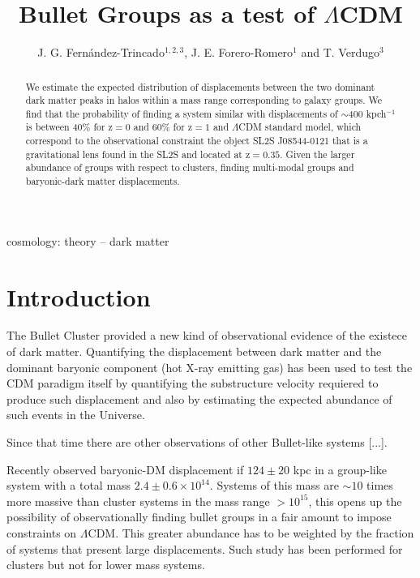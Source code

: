 \documentclass{emulateapj}
\newcommand{\hMsun}{{\ifmmode{h^{-1}{\rm {M_{\odot}}}}\else{$h^{-1}{\rm{M_{\odot}}}$}\fi}}
\newcommand{\Msun}{{\ifmmode{{\rm {M_{\odot}}}}\else{${\rm{M_{\odot}}}$}\fi}}
\begin{document}
 

\title{Bullet Groups as a test of $\Lambda$CDM}
\author{J. G. Fern\'andez-Trincado$^{1,2,3}$, J. E. Forero-Romero$^1$
  and T. Verdugo$^3$} 

\begin{abstract}
We estimate the expected distribution of displacements between the two
dominant dark matter peaks in halos within a mass range corresponding
to galaxy groups. We find that the probability of finding a system
similar with displacements of $\sim$400 kpch$^{-1}$ is between 40\%
for z$=0$ and 60\% for z$=1$ and $\Lambda$CDM standard model, which
correspond to the observational constraint the object SL2S J08544-0121
that is  a gravitational lens found in the SL2S and located at
z$=0.35$. Given the larger abundance of groups with respect to
clusters, finding multi-modal groups and baryonic-dark matter
displacements.  
\end{abstract}

\begin{keywords}
{cosmology: theory -- dark matter} 
\end{keywords}

\section{Introduction}


The Bullet Cluster provided a new kind of observational evidence of
the existece of dark matter. Quantifying the displacement between dark
matter and the dominant baryonic component (hot X-ray emitting gas)
has been used to test the CDM paradigm itself by quantifying the
substructure velocity requiered to produce such displacement and also
by estimating the expected abundance of such events in the Universe.

Since that time there are other observations of other Bullet-like
systems [...].

Recently \citep{Gastaldello} observed baryonic-DM displacement if
$124\pm 20$ kpc in a group-like system with a total mass $2.4\pm 0.6
\times 10^{14}$\Msun. Systems of this mass are $\sim 10$ times more massive
than cluster systems in the mass range $>10^{15}$\hMsun, this opens
up the possibility of observationally finding bullet groups in a fair
amount to impose constraints on $\Lambda$CDM. This greater abundance
has to be weighted by the fraction of systems that present large
displacements. Such study has been performed for clusters but not for
lower mass systems.
\end{document}

